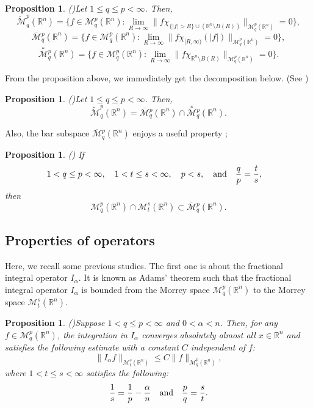 \documentclass[11pt,a4]{article}
\numberwithin{equation}{section}
\newtheorem{proposition}[theorem]{Proposition}
\theoremstyle{definition}
\theoremstyle{remark}
\begin{document}
\begin{proposition}{\rm (\cite[Proposition 331,332,333]{MS1})}\label{char}
	Let $1\le q\le p<\infty$. Then,
		\[
			\widetilde{\mathcal M}^{p}_q({\mathbb R}^n)
			=\{f \in {\mathcal M}^p_q({\mathbb R}^n) : \lim\limits_{R\to \infty} \|f\chi_{\{|f|> R\}\cup(\mathbb{R}^n\setminus B(R))}\|_{\mathcal{M}^p_q({\mathbb R}^n)}=0 \},
		\]
		\[
			\overline{\mathcal M}{}^p_q({\mathbb R}^n)
			=\{f \in {\mathcal M}^p_q({\mathbb R}^n) : \lim\limits_{R\to \infty} 
			\|f\chi_{[R,\infty)}(|f|)\|_{\mathcal{M}^p_q({\mathbb R}^n)}=0\},
		\] 
		\[
			\overset{*}{\mathcal M}{}^p_q({\mathbb R}^n)
			=\{f \in {\mathcal M}^p_q({\mathbb R}^n) : \lim\limits_{R\to \infty} 
			\|f\chi_{\mathbb{R}^n\setminus B(R)}\|_{\mathcal{M}^p_q({\mathbb R}^n)}=0\}.
		\]
\end{proposition}
From the proposition above, we immediately get the decomposition below. (See \cite{MS1})
\begin{proposition}{\rm (\cite[Corollary 334]{MS1})}\label{decom}
	Let $1 \le q \le p < \infty$. Then,
	\begin{equation*}
		\widetilde{\mathcal M}^p_q({\mathbb R}^n)
		=
		\overline{\mathcal M}{}^p_q({\mathbb R}^n)
		\cap
		\overset{*}{\mathcal M}{}^p_q({\mathbb R}^n).
	\end{equation*}
\end{proposition}
Also, the bar subspace $\overline{\mathcal M}{}^p_q({\mathbb R}^n)$ enjoys a useful property \cite{2025};
\begin{proposition}\label{barsubsp}{\rm (\cite[Lemma 6]{2025})}
	If
	\begin{equation*}
		1<q \le p<\infty, \quad 1<t \le s<\infty, \quad p<s, \quad {\rm and} \quad \frac{q}{p}=\frac{t}{s}, \quad
	\end{equation*}
	then
	\[
		{\mathcal M}^p_q({\mathbb R}^n) \cap {\mathcal M}^s_t({\mathbb R}^n) \subset \overline{{\mathcal M}}{}^p_q({\mathbb R}^n).
	\]
\end{proposition}






\subsection{Properties of operators}
Here, we recall some previous studies. The first one is about the fractional integral operator $I_{\alpha}$.
It is known as Adams' theorem such that the fractional integral operator $I_{\alpha}$ is bounded from the Morrey space ${\mathcal M}^{p}_q({\mathbb R}^n)$ to the Morrey space ${\mathcal M}^{s}_t({\mathbb R}^n)$.
\begin{proposition}{\rm(\cite{Adams})}\label{Adams}
	Suppose $1 < q \le p < \infty$ and $0 < \alpha < n$. Then, for any $f \in {\mathcal M}^{p}_q({\mathbb R}^n)$, the integration in $I_{\alpha}$ converges absolutely almost all $x \in {\mathbb{R}}^n$ and satisfies the following estimate with a constant $C$ independent of $f$:
	\[
		\|I_{\alpha}f\|_{{\mathcal M}^{s}_t({\mathbb R}^n)} \le C \|f\|_{{\mathcal M}^{p}_q({\mathbb R}^n)},
	\]
where $1<t \le s < \infty$ satisfies the following:
	\[
		\frac{1}{s}=\frac{1}{p}-\frac{\alpha}{n} \quad {\rm and} \quad \frac{p}{q}=\frac{s}{t}.
	\]
\end{proposition}
\end{document}
